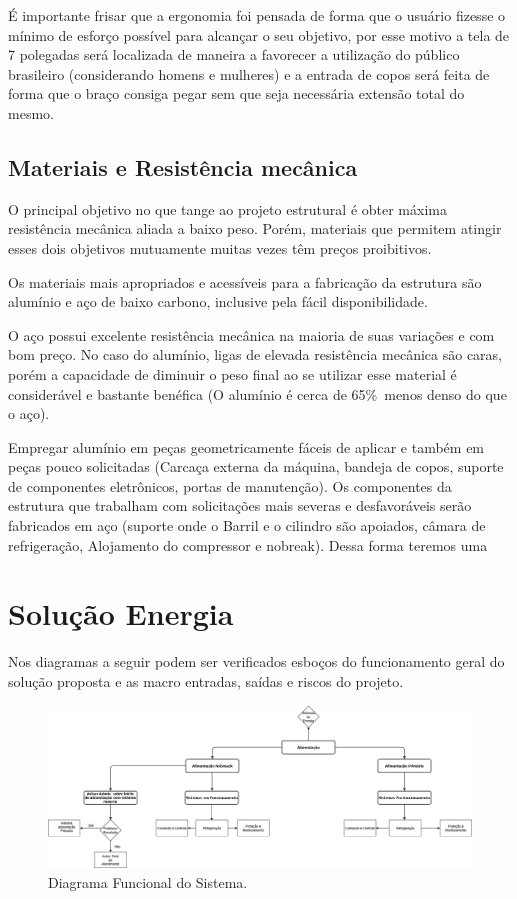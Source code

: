 				É importante frisar que a ergonomia foi pensada de forma que o usuário fizesse o mínimo de esforço possível para alcançar o seu objetivo, por esse motivo a tela de 7 polegadas será localizada de maneira a favorecer a utilização do público brasileiro (considerando homens e mulheres) e a entrada de copos será feita de forma que o braço consiga pegar sem que seja necessária extensão total do mesmo. 


		\subsection[Materiais e Resistência mecânica]{Materiais e Resistência mecânica}
			O principal objetivo no que tange ao projeto estrutural é obter máxima resistência mecânica aliada a baixo peso. Porém, materiais que permitem atingir esses dois objetivos mutuamente muitas vezes têm preços proibitivos.
			
			Os materiais mais apropriados e acessíveis para a fabricação da estrutura são alumínio e aço de baixo carbono, inclusive pela fácil disponibilidade.
			
			O aço possui excelente resistência mecânica na maioria de suas variações e com bom preço. No caso do alumínio, ligas de elevada resistência mecânica são caras, porém a capacidade de diminuir o peso final ao se utilizar esse material é considerável e bastante benéfica (O alumínio é cerca de 65\%\ menos denso do que o aço).

			Empregar alumínio em peças geometricamente fáceis de aplicar  e também em peças pouco solicitadas (Carcaça externa da máquina, bandeja de copos, suporte de componentes eletrônicos, portas de manutenção). Os componentes da estrutura que trabalham com solicitações mais severas e desfavoráveis serão fabricados em aço (suporte onde o Barril e o cilindro são apoiados, câmara de refrigeração, Alojamento do compressor e nobreak). Dessa forma teremos uma


	\section[Solução Energia]{Solução Energia}
		Nos diagramas a seguir podem ser verificados esboços do funcionamento geral do solução proposta e as macro entradas, saídas e riscos do projeto.

		\begin{figure}[H]
			\centering
			\includegraphics[scale= 0.3]{figuras/diagrama-funcional.jpg}
			\caption{Diagrama Funcional do Sistema.}
			\label{diagrama-funcional}
		\end{figure}	

